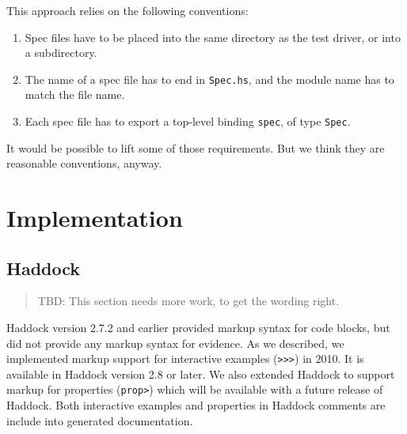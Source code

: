 \documentclass[preprint]{sigplanconf}
\begin{document}
This approach relies on the following conventions:
\begin{enumerate}
    \item
        Spec files have to be placed into the same directory as the
        test driver, or into a subdirectory.
    \item
        The name of a spec file has to end in \verb|Spec.hs|, and the
        module name has to match the file name.
    \item
        Each spec file has to export a top-level binding \verb|spec|,
        of type \verb|Spec|.
\end{enumerate}

\noindent It would be possible to lift some of those requirements.
But we think they are reasonable conventions, anyway.


\section{Implementation}

\subsection{Haddock}
\label{sec:haddock}

\begin{quote}
    TBD: This section needs more work, to get the wording right.
\end{quote}

Haddock version 2.7.2 and earlier provided markup syntax for
code blocks, but did not provide any markup syntax for evidence.
As we described, we implemented markup support for interactive examples ({\tt >>>}) in 2010.
It is available in Haddock version 2.8 or later.
We also extended Haddock to support markup for properties ({\tt prop>}) which
will be available with a future release of Haddock.
Both interactive examples and properties in Haddock comments are
include into generated documentation.



\end{document}
